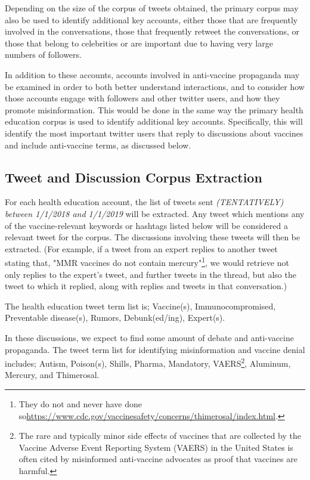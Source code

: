 \documentclass{article}
\begin{document}
Depending on the size of the corpus of tweets obtained, the primary corpus may also be used to identify additional key accounts, either those that are frequently involved in the conversations, those that frequently retweet the conversations, or those that belong to celebrities or are important due to having very large numbers of followers.

In addition to these accounts, accounts involved in anti-vaccine propaganda may be examined in order to both better understand interactions, and to consider how those accounts engage with followers and other twitter users, and how they promote misinformation. This would be done in the same way the primary health education corpus is used to identify additional key accounts. Specifically, this will identify the most important twitter users that reply to discussions about vaccines and include anti-vaccine terms, as discussed below.

\subsection{Tweet and Discussion Corpus Extraction}

For each health education account, the list of tweets sent \textit{(TENTATIVELY) between 1/1/2018 and 1/1/2019} will be extracted. Any tweet which mentions any of the vaccine-relevant keywords or hashtags listed below will be considered a relevant tweet for the corpus. The discussions involving these tweets will then be extracted. (For example, if a tweet from an expert replies to another tweet stating that, "MMR vaccines do not contain mercury"\footnote{They do not and never have done so\url{https://www.cdc.gov/vaccinesafety/concerns/thimerosal/index.html}.}, we would retrieve not only replies to the expert's tweet, and further tweets in the thread, but also the tweet to which it replied, along with replies and tweets in that conversation.)

The health education tweet term list is; Vaccine(s), Immunocompromised, Preventable disease(s), Rumors, Debunk(ed/ing), Expert(s).

In these discussions, we expect to find some amount of debate and anti-vaccine propaganda. The tweet term list for identifying misinformation and vaccine denial includes; Autism, Poison(s), Shills, Pharma, Mandatory, VAERS\footnote{The rare and typically minor side effects of vaccines that are collected by the Vaccine Adverse Event Reporting System (VAERS) in the United States is often cited by misinformed anti-vaccine advocates as proof that vaccines are harmful.}, Aluminum, Mercury, and Thimerosal.
\end{document}
